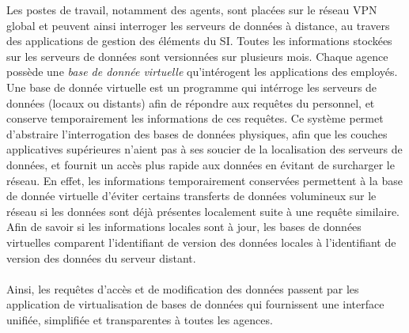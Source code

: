 \documentclass[a4paper]{article}
\begin{document}
Les postes de travail, notamment des agents, sont placées sur le réseau VPN global et peuvent ainsi interroger les serveurs de données à distance, au travers des applications de gestion des éléments du SI. Toutes les informations stockées sur les serveurs de données sont versionnées sur plusieurs mois. Chaque agence possède une \textit{base de donnée virtuelle} qu'intérogent les applications des employés.\\
Une base de donnée virtuelle est un programme qui intérroge les serveurs de données (locaux ou distants) afin de répondre aux requêtes du personnel, et conserve temporairement les informations de ces requêtes. Ce système permet d'abstraire l'interrogation des bases de données physiques, afin que les couches applicatives supérieures n'aient pas à ses soucier de la localisation des serveurs de données, et fournit un accès plus rapide aux données en évitant de surcharger le réseau. En effet, les informations temporairement conservées permettent à la base de donnée virtuelle d'éviter certains transferts de données volumineux sur le réseau si les données sont déjà présentes localement suite à une requête similaire. Afin de savoir si les informations locales sont à jour, les bases de données virtuelles comparent l'identifiant de version des données locales à l'identifiant de version des données du serveur distant.\\
~\\
Ainsi, les requêtes d'accès et de modification des données passent par les application de virtualisation de bases de données qui fournissent une interface unifiée, simplifiée et transparentes à toutes les agences.
\end{document}
